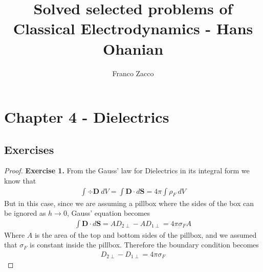 \documentclass[11pt]{article}
\title{\textbf{Solved selected problems of Classical Electrodynamics - Hans Ohanian}}
\author{Franco Zacco}
\date{}
\theoremstyle{definition}
\begin{document}
\maketitle
\thispagestyle{empty}

\section*{Chapter 4 - Dielectrics}

\subsection*{Exercises}

\begin{proof}{\textbf{Exercise 1.}}
From the Gauss' law for Dielectrics in its integral form we know that
\begin{align*}
    \int \div \bm{D}~dV = \int \bm{D}\cdot d\bm{S} = 4\pi \int \rho_F~dV
\end{align*}
But in this case, since we are assuming a pillbox where the sides of the box
can be ignored as $h \to 0$, Gauss' equation becomes
\begin{align*}
    \int \bm{D}\cdot d\bm{S} = AD_{2\perp} - AD_{1\perp} = 4\pi \sigma_F A
\end{align*}
Where $A$ is the area of the top and bottom sides of the pillbox, and we
assumed that $\sigma_F$ is constant inside the pillbox. Therefore
the boundary condition becomes
\begin{align*}
    D_{2\perp} - D_{1\perp} = 4\pi \sigma_F
\end{align*}
\end{proof}
\end{document}
